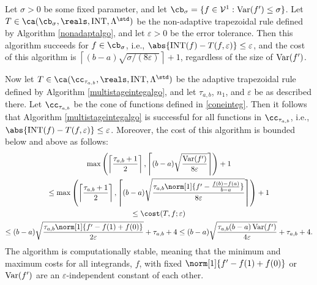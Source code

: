 \begin{theorem} \label{multistageintegthm}
Let $\sigma >0$ be some fixed parameter, and let $\cb_{\sigma}=\{f \in  \mathcal{V}^{1} : \Var(f')\leq \sigma\}$. Let $T \in \ca(\cb_{\sigma}, \reals, \INT, \Lambda^{\std})$ be the non-adaptive trapezoidal rule defined by Algorithm \ref{nonadaptalgo}, and let $\varepsilon>0$ be the error tolerance. Then this algorithm succeeds for $f \in \cb_{\sigma}$, i.e., $\abs{\INT(f) - T(f,\varepsilon)} \le \varepsilon$, and the cost of this algorithm is $\left \lceil (b-a)\sqrt{\sigma/(8\varepsilon)}\right \rceil + 1$, regardless of the size of $\operatorname{Var}(f')$.

Now let $T \in \ca(\cc_{\tau_{a,b}}, \reals, \INT, \Lambda^{\std})$ be the adaptive trapezoidal rule defined by Algorithm \ref{multistageintegalgo}, and let $\tau_{a,b}$, $n_1$, and $\varepsilon$ be as described there. Let $\cc_{\tau_{a,b}}$ be the cone of functions defined in \eqref{coneinteg}.  Then it follows that Algorithm \ref{multistageintegalgo} is successful for all functions in $\cc_{\tau_{a,b}}$,  i.e.,  $\abs{\INT(f) - T(f,\varepsilon)} \le \varepsilon$.  Moreover, the cost of this algorithm is bounded below and above as follows:
\begin{multline}
\max \left(\left \lceil\frac{\tau_{a,b}+1}{2} \right \rceil, \left \lceil (b-a)\sqrt{\frac{ \Var(f')}{8\varepsilon}} \right \rceil \right) +1 \\
\le \max \left(\left \lceil\frac{\tau_{a,b}+1}{2} \right \rceil, \left \lceil (b-a)\sqrt{\frac{\tau_{a,b} \norm[1]{f'-\frac{f(b)-f(a)}{b-a}}}{8\varepsilon}} \right \rceil \right) +1 \\
\le
\cost(T,f;\varepsilon) \\
\le (b-a)\sqrt{\frac{\tau_{a,b} \norm[1]{f'-f(1)+f(0)}}{2\varepsilon}} + \tau_{a,b} + 4
\le (b-a)\sqrt{\frac{\tau_{a,b}(b-a) \Var(f') }{4\varepsilon}} + \tau_{a,b} + 4.
\end{multline}
The algorithm is computationally stable, meaning that the minimum and maximum costs for all integrands, $f$, with fixed $\norm[1]{f'-f(1)+f(0)}$ or $\operatorname{Var}(f')$ are an $\varepsilon$-independent constant of each other.
\end{theorem}
\newpage

